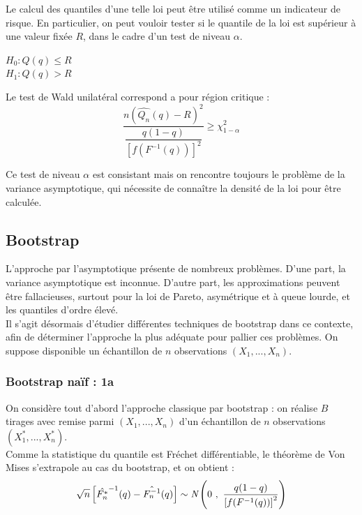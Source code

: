\documentclass{article}
\renewcommand*{\(}{\left(}
\renewcommand*{\)}{\right)}
\begin{document}
Le calcul des quantiles d'une telle loi peut être utilisé comme un indicateur de risque. En particulier, on peut vouloir tester si le quantile de la loi est supérieur à une valeur fixée $R$, dans le cadre d'un test de niveau $\alpha$.\\
\begin{center}
$H_0 : Q(q) \leq R$\\
$H_1 : Q(q) > R$\\
\end{center}
Le test de Wald unilatéral correspond a pour région critique :  \\

\[\frac{n(\hat{Q_n}(q)-R)^2}{\dfrac{q(1-q)}{[f(F^{-1}(q))]^2}} \geq \chi^2_{1-\alpha}\]

Ce test de niveau $\alpha$ est consistant mais on rencontre toujours le problème de la variance asymptotique, qui nécessite de connaître la densité de la loi pour être calculée.

\subsection{Bootstrap}
L'approche par l'asymptotique présente de nombreux problèmes.
D'une part, la variance asymptotique est inconnue. D'autre part, les approximations peuvent être fallacieuses, surtout pour la loi de Pareto, asymétrique et à queue lourde, et les quantiles d'ordre élevé.\\

Il s'agit désormais d'étudier différentes techniques de bootstrap dans ce contexte, afin de déterminer l'approche la plus adéquate pour pallier ces problèmes. On suppose disponible un échantillon de $n$ observations $(X_1, ..., X_n)$.

\subsubsection{Bootstrap naïf : 1a}
On considère tout d'abord l'approche classique par bootstrap : on réalise $B$ tirages avec remise parmi $(X_1, ..., X_n)$ d'un échantillon de $n$ observations $(X^*_1, ..., X^*_n)$.\\

Comme la statistique du quantile est Fréchet différentiable, le théorème de Von Mises s'extrapole au cas du bootstrap, et on obtient :\\
\begin{equation*}
\sqrt{n}\left[\hat{F_n^*}^{-1}(q)-\hat{F_n^{-1}}(q)\right]\sim \emph{N}\(0~,~\frac{q(1-q)}{\left[f(F^{-1}(q))\right]^2}\)
\end{equation*}\\
\end{document}

